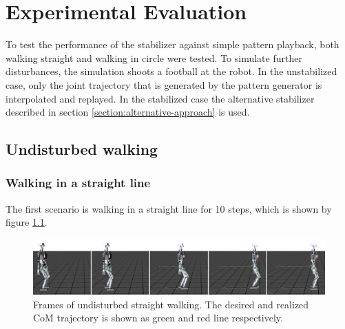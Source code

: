 \documentclass[english,ngerman]{KITreprt}
\begin{document}
\chapter{Experimental Evaluation}\label{experimental-evaluation}

To test the performance of the stabilizer against simple pattern
playback, both walking straight and walking in circle were tested. To
simulate further disturbances, the simulation shoots a football at the
robot. In the unstabilized case, only the joint trajectory that is
generated by the pattern generator is interpolated and replayed. In the
stabilized case the alternative stabilizer described in section
\ref{section:alternative-approach} is used.

\section{Undisturbed walking}\label{undisturbed-walking}

\subsection{Walking in a straight
line}\label{walking-in-a-straight-line}

The first scenario is walking in a straight line for 10 steps, which is
shown by figure \ref{img:player-undisturbed-straight-thumbs}.

\begin{figure}[H]
\vspace*{-1em}
\includegraphics[width=\textwidth]{images/undisturbed_straight_thumbs.png}
\caption{Frames of undisturbed straight walking. The desired and realized CoM trajectory is shown as green and red
line respectively. \cite{niklaus2014videostraight}}
\label{img:player-undisturbed-straight-thumbs}
\end{figure}
\end{document}

